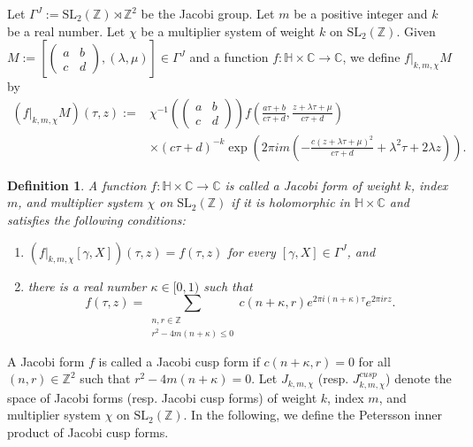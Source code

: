 \documentclass[11pt]{amsart}
\newtheorem{dfn}[thm]{Definition}
\theoremstyle{definition}
\theoremstyle{remark}
\numberwithin{equation}{section}
\newcommand{\sm}{\left(\begin{smallmatrix}}
\newcommand{\esm}{\end{smallmatrix}\right)}
\renewcommand{\(}{\left(}
\renewcommand{\)}{\right)}
\def\ZZ{\mathbb{Z}}
\def\SL{\mathrm{SL}}
\begin{document}
Let $\Gamma^{J}:=\SL_2(\mathbb{Z})\rtimes \mathbb{Z}^{2}$ be the Jacobi group. 
Let $m$ be a positive integer and $k$ be a real number. 
Let $\chi$ be a multiplier system of weight $k$ on $\mathrm{SL}_{2}(\mathbb{Z})$.
Given $M:=\left[\sm a & b\\
c & d\esm, (\lambda,\mu) \right]\in \Gamma^{J}$ and a function $f:\mathbb{H}\times \mathbb{C}\to \mathbb{C}$, we define $f|_{k,m,\chi}M$ by
\begin{equation*}
    \begin{aligned}
    \left(f|_{k,m,\chi}M\right)(\tau,z):=&\chi^{-1}\left(\left(\begin{smallmatrix}
    a & b\\
    c & d
    \end{smallmatrix}\right)\right)f\left(\frac{a\tau+b}{c\tau+d}, \frac{z+\lambda \tau+\mu}{c\tau+d}\right)\\
    &\times(c\tau+d)^{-k}\exp\left(2\pi i m\left(-\frac{c(z+\lambda\tau+\mu)^2}{c\tau+d}+\lambda^2\tau+2\lambda z\right)\right).
    \end{aligned}
\end{equation*}


\begin{dfn}\label{def : def of Jacobi form}
    A function $f:\mathbb{H}\times \mathbb{C}\to \mathbb{C}$ is called a Jacobi form of weight $k$, index $m$, and multiplier system $\chi$ on $\mathrm{SL}_{2}(\mathbb{Z})$ if it is holomorphic in $\mathbb{H}\times \mathbb{C}$ and satisfies the following conditions: 
    \begin{enumerate}
        \item   $\left(f|_{k,m,\chi}[\gamma,X]\right)(\tau,z)=f(\tau,z)$ for every $[\gamma,X]\in \Gamma^{J}$, and
        \item there is a real number $\kappa\in [0,1)$ such that 
        \[ f(\tau,z)=\sum_{\substack{n,r\in \ZZ \\ r^2-4m(n+\kappa)\leq 0}}c(n+\kappa,r)e^{2\pi i(n+\kappa)\tau}e^{2\pi i rz}. \]
    \end{enumerate}
\end{dfn}
A Jacobi form $f$ is called a Jacobi cusp form if $c(n+\kappa,r)=0$ for all $(n,r)\in \mathbb{Z}^{2}$ such that $r^2-4m(n+\kappa)=0$. 
Let $J_{k,m,\chi}$ (resp. $J^{cusp}_{k,m,\chi}$) denote the space of Jacobi forms (resp. Jacobi cusp forms) of weight $k$, index $m$, and multiplier system $\chi$ on $\mathrm{SL}_{2}(\mathbb{Z})$.
In the following, we define the Petersson inner product of Jacobi cusp forms. 
\end{document}

